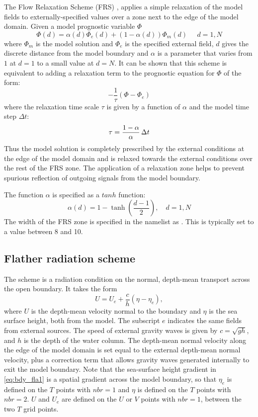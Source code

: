 \documentclass[../main/NEMO_manual]{subfiles}
\begin{document}
The Flow Relaxation Scheme (FRS) \citep{Davies_QJRMS76,Engerdahl_Tel95},
applies a simple relaxation of the model fields to externally-specified values over
a zone next to the edge of the model domain.
Given a model prognostic variable $\Phi$
\[
  \Phi(d) = \alpha(d)\Phi_{e}(d) + (1-\alpha(d))\Phi_{m}(d)\;\;\;\;\; d=1,N
\]
where $\Phi_{m}$ is the model solution and $\Phi_{e}$ is the specified external field,
$d$ gives the discrete distance from the model boundary and
$\alpha$ is a parameter that varies from $1$ at $d=1$ to a small value at $d=N$.
It can be shown that this scheme is equivalent to adding a relaxation term to
the prognostic equation for $\Phi$ of the form:
\[
  -\frac{1}{\tau}\left(\Phi - \Phi_{e}\right)
\]
where the relaxation time scale $\tau$ is given by a function of $\alpha$ and the model time step $\Delta t$:
\[
  \tau = \frac{1-\alpha}{\alpha}  \,\Delta t
\]
Thus the model solution is completely prescribed by the external conditions at the edge of the model domain and
is relaxed towards the external conditions over the rest of the FRS zone.
The application of a relaxation zone helps to prevent spurious reflection of
outgoing signals from the model boundary. 

The function $\alpha$ is specified as a $tanh$ function:
\[
  \alpha(d) = 1 - \tanh\left(\frac{d-1}{2}\right),       \quad d=1,N
\]
The width of the FRS zone is specified in the namelist as .
This is typically set to a value between 8 and 10.

\subsection{Flather radiation scheme}
\label{subsec:BDY_flather_scheme}

The \citet{Flather_JPO94} scheme is a radiation condition on the normal,
depth-mean transport across the open boundary.
It takes the form
\begin{equation}  \label{eq:bdy_fla1}
U = U_{e} + \frac{c}{h}\left(\eta - \eta_{e}\right),
\end{equation}
where $U$ is the depth-mean velocity normal to the boundary and $\eta$ is the sea surface height,
both from the model.
The subscript $e$ indicates the same fields from external sources.
The speed of external gravity waves is given by $c = \sqrt{gh}$, and $h$ is the depth of the water column.
The depth-mean normal velocity along the edge of the model domain is set equal to
the external depth-mean normal velocity,
plus a correction term that allows gravity waves generated internally to exit the model boundary.
Note that the sea-surface height gradient in \autoref{eq:bdy_fla1} is a spatial gradient across the model boundary,
so that $\eta_{e}$ is defined on the $T$ points with $nbr=1$ and $\eta$ is defined on the $T$ points with $nbr=2$.
$U$ and $U_{e}$ are defined on the $U$ or $V$ points with $nbr=1$, \ie between the two $T$ grid points.
\end{document}
